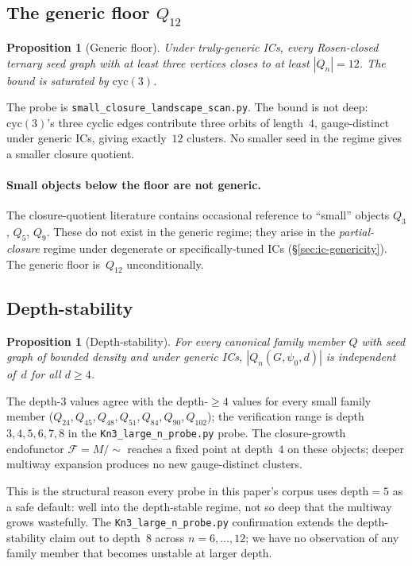 \documentclass[12pt,a4paper]{article}
\newtheorem{proposition}[theorem]{Proposition}
\theoremstyle{definition}
\theoremstyle{remark}
\newcommand{\Qn}{Q_n}
\newcommand{\Fcls}{\mathcal{F}}             %
\newcommand{\cyc}{\mathrm{cyc}}
\begin{document}
\subsection{The generic floor $Q_{12}$}\label{sec:law-floor}

\begin{proposition}[Generic floor]\label{prop:floor-Q12}
Under truly-generic ICs, every Rosen-closed ternary seed graph with at
least three vertices closes to at least $|\Qn| = 12$. The bound is
saturated by $\cyc(3)$.
\end{proposition}

The probe is \texttt{small\_closure\_landscape\_scan.py}. The bound is
not deep: $\cyc(3)$'s three cyclic edges contribute three orbits of
length~$4$, gauge-distinct under generic ICs, giving exactly~$12$
clusters. No smaller seed in the regime gives a smaller closure
quotient.

\paragraph{Small objects below the floor are not generic.}
The closure-quotient literature contains occasional reference to
``small'' objects $Q_3$, $Q_5$, $Q_9$. These do not exist in the
generic regime; they arise in the \emph{partial-closure} regime under
degenerate or specifically-tuned ICs (\S\ref{sec:ic-genericity}). The
generic floor is~$Q_{12}$ unconditionally.

\subsection{Depth-stability}\label{sec:law-depth}

\begin{proposition}[Depth-stability]\label{prop:depth-stable}
For every canonical family member $Q$ with seed graph of bounded
density and under generic ICs, $|\Qn(G, \psi_0, d)|$ is independent
of~$d$ for all $d \ge 4$.
\end{proposition}

The depth-$3$ values agree with the depth-$\ge 4$ values for every
small family member ($Q_{24}, Q_{45}, Q_{48}, Q_{51}, Q_{84}, Q_{90},
Q_{102}$); the verification range is depth $3, 4, 5, 6, 7, 8$ in the
\texttt{Kn3\_large\_n\_probe.py} probe. The closure-growth endofunctor
$\Fcls = M/{\sim}$ reaches a fixed point at depth~$4$ on these objects;
deeper multiway expansion produces no new gauge-distinct clusters.

This is the structural reason every probe in this paper's corpus uses
$\text{depth} = 5$ as a safe default: well into the depth-stable regime,
not so deep that the multiway grows wastefully. The
\texttt{Kn3\_large\_n\_probe.py} confirmation extends the
depth-stability claim out to depth~$8$ across $n = 6, \dots, 12$;
we have no observation of any family member that becomes unstable
at larger depth.
\end{document}
